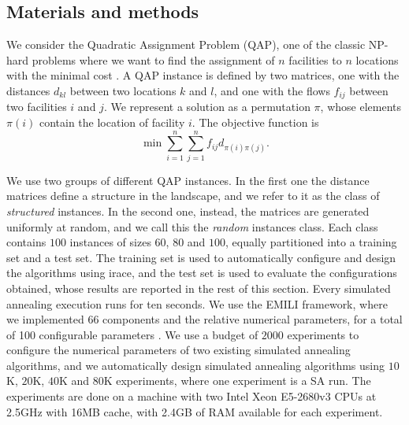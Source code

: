 \subsection{Materials and methods}\label{sec:material}
We consider the Quadratic Assignment Problem (QAP), one of the classic NP-hard
problems where we want to find the assignment of $n$ facilities to $n$ locations
with the minimal cost \cite{KooBec57}. A QAP instance is defined by two
matrices, one with the distances $d_{kl}$ between two locations $k$ and $l$, and
one with the flows $f_{ij}$ between two facilities $i$ and $j$.
We represent a solution as a permutation $\pi$, whose
elements $\pi(i)$ contain the location of facility $i$. The objective function is
\begin{equation}
  \min\sum_{i=1}^n\sum_{j=1}^n f_{ij} d_{{\pi(i)}{\pi(j)}}.
\end{equation}

We use two groups of different QAP instances. In the first one the distance matrices 
define a structure in the landscape, and we refer to it as the class of \textit{structured} instances. 
In the second one, instead, the matrices are generated
uniformly at random, and we call this the \textit{random} instances class.
Each class
contains $100$ instances of sizes $60$, $80$ and $100$, equally partitioned into
a training set and a test set.
The training set is used to automatically configure 
and design the algorithms using irace, and the test set is used to 
evaluate the configurations obtained, whose results are reported
in the rest of this section.
Every simulated annealing execution runs for ten seconds.
We use the EMILI framework,
where we implemented 66 components and the relative numerical parameters,
for a total of 100 configurable parameters \cite{PagStu2019:ejor}.
We use a budget of $2000$ experiments to configure the numerical parameters
of two existing simulated annealing algorithms, and we automatically design simulated annealing algorithms
using $10$K, $20$K, $40$K and $80$K experiments, where one experiment is a SA run.
The experiments are done on a machine with two Intel Xeon E5-2680v3 CPUs 
at 2.5GHz with 16MB cache, with 2.4GB of RAM available for each experiment.

